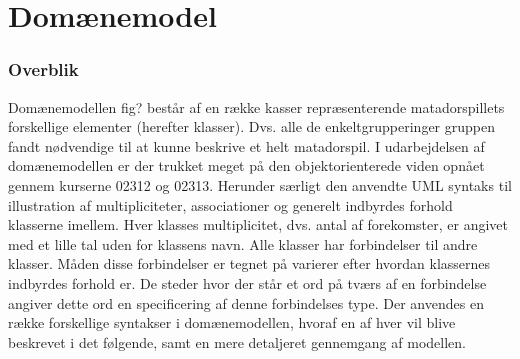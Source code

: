 \chapter{Domænemodel}\label{chap:domain}
\subsection{Overblik}\label{chap:domain:sec:overblik}
Domænemodellen fig?  består af en række kasser repræsenterende matadorspillets forskellige elementer (herefter klasser). Dvs. alle de enkeltgrupperinger gruppen fandt nødvendige til at kunne beskrive et helt matadorspil. I udarbejdelsen af domænemodellen er der trukket meget på den objektorienterede viden opnået gennem kurserne 02312 og 02313. Herunder særligt den anvendte UML syntaks til illustration af multipliciteter, associationer og generelt indbyrdes forhold klasserne imellem. Hver klasses multiplicitet, dvs. antal af forekomster, er angivet med et lille tal uden for klassens navn. Alle klasser har forbindelser til andre klasser. Måden disse forbindelser er tegnet på varierer efter hvordan klassernes indbyrdes forhold er. De steder hvor der står et ord på tværs af en forbindelse angiver dette ord en specificering af denne forbindelses type. Der anvendes en række forskellige syntakser i domænemodellen, hvoraf en af hver vil blive beskrevet i det følgende, samt en mere detaljeret gennemgang af modellen.

